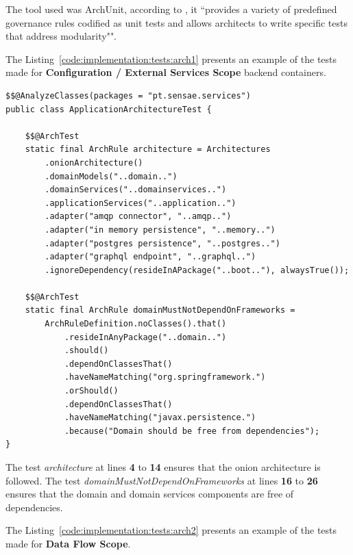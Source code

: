 The tool used was ArchUnit, according to \cite{archunit}, it ``provides a variety of predefined governance rules codified as unit tests and allows architects to write specific tests that address modularity"".

The Listing~\ref{code:implementation:tests:arch1} presents an example of the tests made for \textbf{Configuration / External Services Scope} backend containers.

\begin{lstlisting}[style=Java, caption=Architectural Test - Onion Architecture - \textbf{Device Management Master Backend}, label={code:implementation:tests:arch1}]
$$@AnalyzeClasses(packages = "pt.sensae.services")
public class ApplicationArchitectureTest {

    $$@ArchTest
    static final ArchRule architecture = Architectures
        .onionArchitecture()
        .domainModels("..domain..")
        .domainServices("..domainservices..")
        .applicationServices("..application..")
        .adapter("amqp connector", "..amqp..")
        .adapter("in memory persistence", "..memory..")
        .adapter("postgres persistence", "..postgres..")
        .adapter("graphql endpoint", "..graphql..")
        .ignoreDependency(resideInAPackage("..boot.."), alwaysTrue());

    $$@ArchTest
    static final ArchRule domainMustNotDependOnFrameworks =
        ArchRuleDefinition.noClasses().that()
            .resideInAnyPackage("..domain..")
            .should()
            .dependOnClassesThat()
            .haveNameMatching("org.springframework.")
            .orShould()
            .dependOnClassesThat()
            .haveNameMatching("javax.persistence.")
            .because("Domain should be free from dependencies");
}
\end{lstlisting}

The test \textit{architecture} at lines \textbf{4} to \textbf{14} ensures that the onion architecture is followed. The test \textit{domainMustNotDependOnFrameworks} at lines \textbf{16} to \textbf{26} ensures that the domain and domain services components are free of dependencies.

The Listing~\ref{code:implementation:tests:arch2} presents an example of the tests made for \textbf{Data Flow Scope}.

